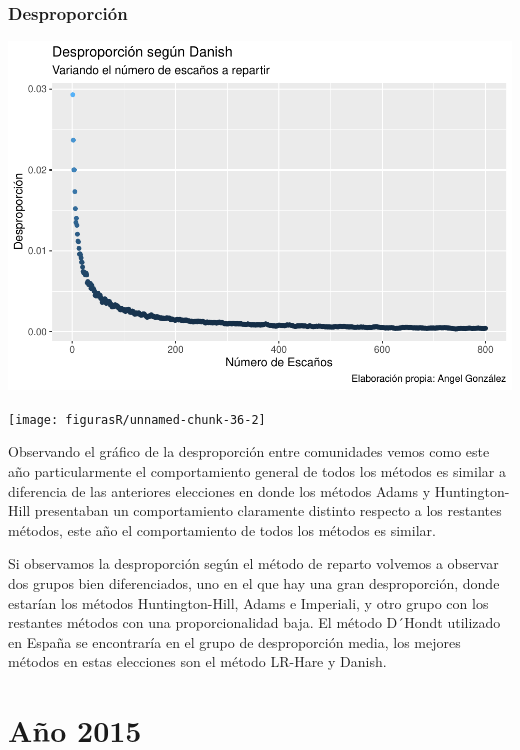 \documentclass[12pt,a4paper,]{book}
\numberwithin{dummy}{section}
\theoremstyle{ocrenumbox}
\theoremstyle{blacknumex}
\theoremstyle{blacknumbox}
\theoremstyle{ocrenum}
\theoremstyle{ocrenum}
\begin{document}
\hypertarget{desproporciuxf3n-10}{%
\subsubsection{Desproporción}\label{desproporciuxf3n-10}}

\begin{center}\includegraphics[width=1\linewidth]{figurasR/unnamed-chunk-36-1} \end{center}

\begin{center}\texttt{[image: figurasR/unnamed-chunk-36-2]} \end{center}

Observando el gráfico de la desproporción entre comunidades vemos como
este año particularmente el comportamiento general de todos los métodos
es similar a diferencia de las anteriores elecciones en donde los
métodos Adams y Huntington-Hill presentaban un comportamiento claramente
distinto respecto a los restantes métodos, este año el comportamiento de
todos los métodos es similar.

Si observamos la desproporción según el método de reparto volvemos a
observar dos grupos bien diferenciados, uno en el que hay una gran
desproporción, donde estarían los métodos Huntington-Hill, Adams e
Imperiali, y otro grupo con los restantes métodos con una
proporcionalidad baja. El método D´Hondt utilizado en España se
encontraría en el grupo de desproporción media, los mejores métodos en
estas elecciones son el método LR-Hare y Danish.

\hypertarget{auxf1o-2015}{%
\section{Año 2015}\label{auxf1o-2015}}
\end{document}
